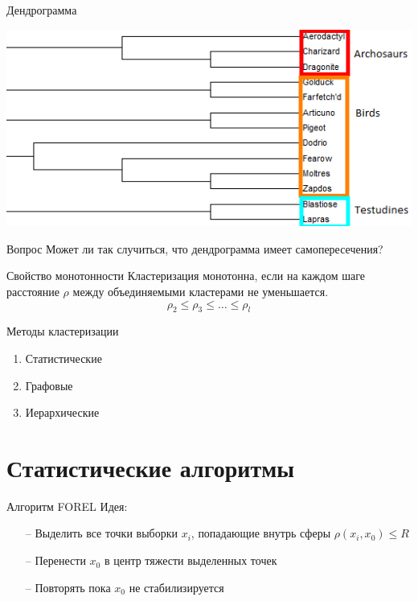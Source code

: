 \documentclass[10pt]{beamer}
\begin{document}
\begin{frame}{Дендрограмма}
  \begin{center}
    \includegraphics[height=0.8 \textheight, width=0.8 \textwidth, keepaspectratio = true]{images/dendrogram1}    
  \end{center}
\end{frame}

\begin{frame}{Вопрос}
  \centering  
  Может ли так случиться, что дендрограмма имеет самопересечения?
\end{frame}

\begin{frame}{Свойство монотонности}
  Кластеризация монотонна, если на каждом шаге расстояние $\rho$ между объединяемыми кластерами не уменьшается.\\
  \bigbreak  
  $$\rho_2 \leq \rho_3 \leq \dots \leq \rho_l$$
\end{frame}

\begin{frame}{Методы кластеризации}
	\begin{enumerate} [-]
    \item Статистические 				
		\item Графовые 
		\item Иерархические
	\end{enumerate}
\end{frame}

\section{Статистические алгоритмы}

\begin{frame}{Алгоритм FOREL}
  \alert{Идея}:\\
	\begin{itemize}
		\item[--] Выделить все точки выборки $x_i$, попадающие внутрь сферы $\rho(x_i, x_0) \leq R$
		\item[--] Перенести $x_0$ в центр тяжести выделенных точек
		\item[--] Повторять пока $x_0$ не стабилизируется
	\end{itemize}
\end{frame}
\end{document}
